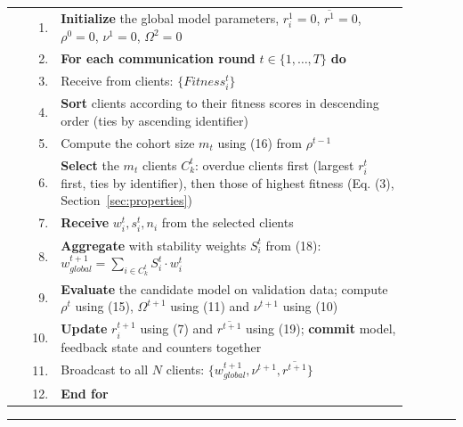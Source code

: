 \documentclass[pdflatex,sn-mathphys-num,oneside]{sn-jnl}%
\theoremstyle{thmstyleone}%
\theoremstyle{thmstyletwo}%
\theoremstyle{thmstylethree}%
\begin{document}
\noindent\begin{tabular}{r@{\hspace{0.7em}}p{0.88\linewidth}}
1.  & \textbf{Initialize} the global model parameters, $r^1_i = 0$, $\overline{r^1}=0$, $\rho^0=0$, $\nu^1=0$, $\Omega^2=0$\\
2.  & \textbf{For each communication round} $t \in \{1,\ldots,T\}$ \textbf{do}\\
3.  & \hspace{2em}Receive from clients: $\{Fitness^t_i\}$\\
4.  & \hspace{1em}\textbf{Sort} clients according to their fitness scores in descending order (ties by ascending identifier)\\
5.  & \hspace{2em}Compute the cohort size $m_t$ using (16) from $\rho^{t-1}$\\
6.  & \hspace{1em}\textbf{Select} the $m_t$ clients $C^t_k$: overdue clients first (largest $r^t_i$ first, ties by identifier), then those of highest fitness (Eq. (3), Section~\ref{sec:properties})\\
7.  & \hspace{1em}\textbf{Receive} $w^t_i, s^t_i, n_i$ from the selected clients\\
8.  & \hspace{1em}\textbf{Aggregate} with stability weights $S^t_i$ from (18):
$w^{t+1}_{global}=\displaystyle\sum_{i \in C^t_k} S^t_i \cdot w^t_i$\\
9.  & \hspace{1em}\textbf{Evaluate} the candidate model on validation data; compute $\rho^t$ using (15), $\Omega^{t+1}$ using (11) and $\nu^{t+1}$ using (10)\\
10. & \hspace{1em}\textbf{Update} $r^{t+1}_i$ using (7) and $\overline{r^{t+1}}$ using (19); \textbf{commit} model, feedback state and counters together\\
11. & \hspace{2em}Broadcast to all $N$ clients: $\{w^{t+1}_{global}, \nu^{t+1}, \overline{r^{t+1}}\}$\\
12. & \textbf{End for}\\
\end{tabular}

\vspace{1mm}
\noindent\rule{\linewidth}{0.4pt}
\endgroup
\end{document}
